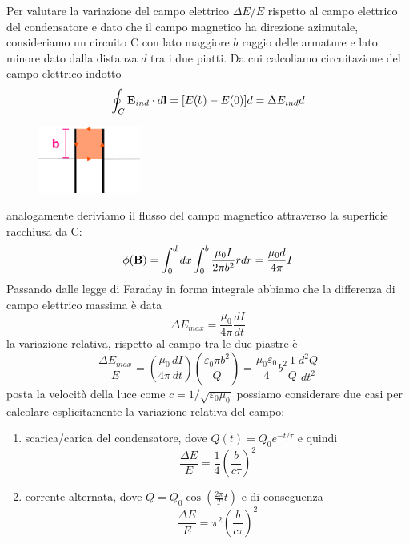 Per valutare la variazione del campo elettrico $\Delta E/E$ rispetto al campo elettrico del condensatore  e dato che il campo magnetico ha direzione azimutale, consideriamo un circuito C con lato maggiore $b$ raggio delle armature e lato minore dato dalla distanza $d$ tra i due piatti. Da cui calcoliamo circuitazione del campo elettrico indotto
\begin{equation*}
	\oint_{C} \bold{E}_{ind} \cdot d\bold{l} = [E(b) - E(0)]d = \Delta E_{ind}d
\end{equation*}
\begin{figure}
    \centering
    \includegraphics[width=0.3\textwidth]{images/parallel_plate4} %
\end{figure}
analogamente deriviamo il flusso del campo magnetico attraverso la superficie racchiusa da C: 
\begin{equation*}
	\phi(\bold{B}) = \int_{0}^{d}dx \int_{0}^{b} \frac{\mu_0 I}{2 \pi b^2}r dr = \frac{\mu_0 d }{4 \pi }I
\end{equation*}
Passando dalle legge di Faraday in forma integrale abbiamo che la differenza di campo elettrico massima \`e data 
\begin{equation*}
	\Delta E_{max} = \frac{\mu_0}{4 \pi}\frac{dI}{dt}
\end{equation*}
la variazione relativa, rispetto al campo tra le due piastre \`e 
\begin{equation*}
	\frac{\Delta E_{max}}{E} = \left(\frac{\mu_0}{4 \pi} \frac{dI}{dt}\right)\left(\frac{\varepsilon_0 \pi b^2}{Q}\right)= \frac{\mu_0 \varepsilon_0}{4}b^2 \frac{1}{Q}\frac{d^2Q}{dt^2}
\end{equation*}
posta la velocit\`a della luce come $c = 1/\sqrt{\varepsilon_0 \mu_0}$  possiamo considerare due casi per calcolare esplicitamente la variazione relativa del campo:
\begin{enumerate}
	\item scarica/carica del condensatore, dove $Q(t) = Q_0 e^{-t/\tau}$ e quindi 
	\begin{equation*}
		\frac{\Delta E}{E} = \frac{1}{4} \left(\frac{b}{c \tau}\right)^2
	\end{equation*}
	\item corrente alternata, dove $Q = Q_0 \cos \left(\frac{2\pi}{T}t\right)$ e di conseguenza
	\begin{equation*}
				\frac{\Delta E}{E} = \pi^2 \left(\frac{b}{c \tau}\right)^2
	\end{equation*}
\end{enumerate}

